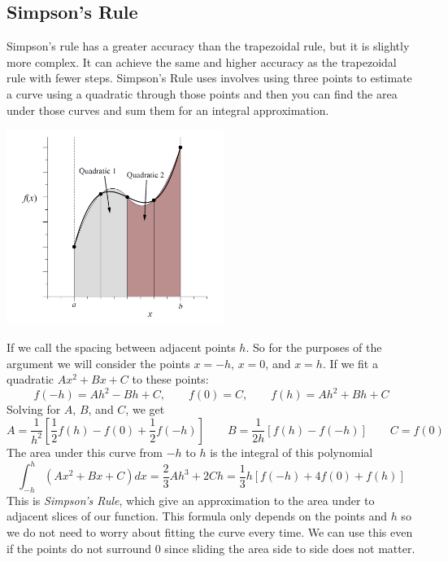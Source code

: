         \subsection{Simpson's Rule}
            Simpson's rule has a greater accuracy than the trapezoidal rule, but it is slightly more complex. It can achieve the same and higher accuracy as the trapezoidal rule with fewer steps. 
            \newline \indent
            Simpson's Rule uses involves using three points to estimate a curve using a quadratic through those points and then you can find the area under those curves and sum them for an integral approximation. 
            \begin{center}
                \includegraphics[width=200pt]{simpsons_rule.png}
            \end{center}
            If we call the spacing between adjacent points $h$. So for the purposes of the argument we will consider the points $x = -h$, $x = 0$, and $x = h$. If we fit a quadratic $Ax^2 + Bx + C$ to these points:
            \begin{equation*}
                f(-h) = Ah^2 - Bh + C, \qquad f(0) = C, \qquad f(h) = Ah^2 + Bh + C
            \end{equation*}
            Solving for $A$, $B$, and $C$, we get
            \begin{equation*}
                A = \frac{1}{h^2}[\frac{1}{2}f(h) - f(0) + \frac{1}{2}f(-h)] \qquad B = \frac{1}{2h}[f(h) - f(-h)] \qquad C = f(0)
            \end{equation*}
            The area under this curve from $-h$ to $h$ is the integral of this polynomial
            \begin{equation*}
                \int_{-h}^h (Ax^2 + Bx + C) dx = \frac{2}{3}Ah^3 + 2Ch = \frac{1}{3}h[f(-h) + 4f(0) + f(h)]
            \end{equation*}
            This is \textit{Simpson's Rule}, which give an approximation to the area under to adjacent slices of our function. This formula only depends on the points and $h$ so we do not need to worry about fitting the curve every time. We can use this even if the points do not surround 0 since sliding the area side to side does not matter.
